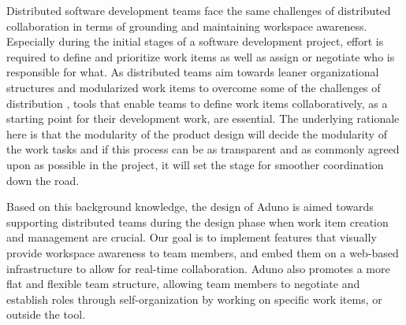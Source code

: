 \documentclass[conference]{IEEEtran}
\begin{document}
Distributed software development teams face the same challenges of distributed collaboration in terms of grounding and maintaining workspace awareness. Especially during the initial stages of a software development project, effort is required to define and prioritize work items as well as assign or negotiate who is responsible for what. As distributed teams aim towards leaner organizational structures and modularized work items to overcome some of the challenges of distribution \cite{Herbsleb07, HG99, Parnas72}, tools that enable teams to define work items collaboratively, as a starting point for their development work, are essential. The underlying rationale here is that the modularity of the product design will decide the modularity of the work tasks and if this process can be as transparent and as commonly agreed upon as possible in the project, it will set the stage for smoother coordination down the road. 


Based on this background knowledge, the design of Aduno is aimed towards supporting distributed teams during the design phase when work item creation and management are crucial. Our goal is to implement features that visually provide workspace awareness to team members, and embed them on a web-based infrastructure to allow for real-time collaboration. Aduno also promotes a more flat and flexible team structure, allowing team members to negotiate and establish roles through self-organization by working on specific work items, or outside the tool.
\end{document}
